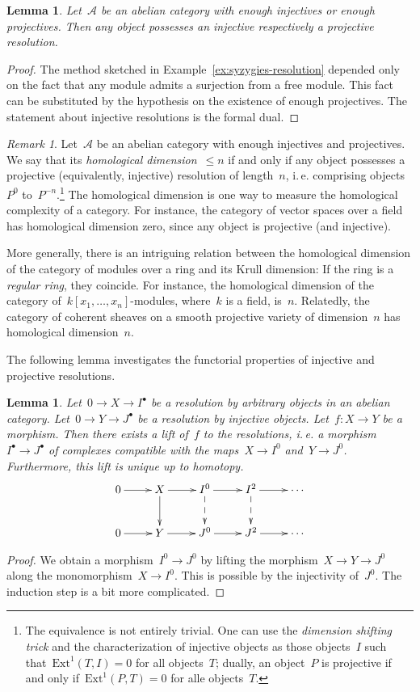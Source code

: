 \documentclass{amsart}
\makeatletter
\theoremstyle{definition}
\theoremstyle{plain}
\newtheorem{lemma}[defn]{Lemma}
\theoremstyle{remark}
\newtheorem{rem}[defn]{Remark}
\newcommand{\A}{\mathcal{A}}
\newcommand{\Ext}{\mathrm{Ext}}
\newcommand{\?}{\,{:}\,}
\renewcommand{\_}{\mathpunct{.}\,}
\newcommand{\ie}{i.\,e.\@\xspace}
\makeatother
\begin{document}
\begin{lemma}Let~$\A$ be an abelian category with enough injectives or enough
projectives. Then any object possesses an injective respectively a projective
resolution.\end{lemma}
\begin{proof}The method sketched in Example~\ref{ex:syzygies-resolution}
depended only on the fact that any module admits a surjection from a free
module. This fact can be substituted by the hypothesis on the existence of
enough projectives. The statement about injective resolutions is the formal
dual.\end{proof}

\begin{rem}Let~$\A$ be an abelian category with enough injectives and
projectives. We say that its \emph{homological dimension}~$\leq n$ if and only
if any object possesses a projective (equivalently, injective) resolution of
length~$n$, \ie comprising objects~$P^0$ to~$P^{-n}$.\footnote{The equivalence
is not entirely trivial. One can use the \emph{dimension shifting trick}
and the characterization of injective objects as those objects~$I$ such
that~$\Ext^1(T,I) = 0$ for all objects~$T$; dually, an object~$P$ is projective
if and only if~$\Ext^1(P,T) = 0$ for alle objects~$T$.} The homological
dimension is one way to measure the homological complexity of a category. For
instance, the category of vector spaces over a field has homological dimension
zero, since any object is projective (and injective).

More generally, there is
an intriguing relation between the homological dimension of the category of
modules over a ring and its Krull dimension: If the ring is a \emph{regular
ring}, they coincide. For instance, the homological dimension of the category
of~$k[x_1,\ldots,x_n]$-modules, where~$k$ is a field, is~$n$. Relatedly, the
category of coherent sheaves on a smooth projective variety of
dimension~$n$ has homological dimension~$n$.
\end{rem}

The following lemma investigates the functorial properties of injective and
projective resolutions.

\begin{lemma}\label{lemma:inj-funct}Let~$0 \to X \to I^\bullet$ be a resolution
by arbitrary objects in an abelian category. Let~$0 \to Y \to J^\bullet$ be a
resolution by injective objects. Let~$f : X \to Y$ be a morphism. Then there
exists a lift of~$f$ to the resolutions, \ie a morphism~$I^\bullet \to
J^\bullet$ of complexes compatible with the maps~$X \to I^0$ and~$Y \to J^0$.
Furthermore, this lift is unique up to homotopy.
\[ \xymatrix{
  0 \ar[r] & X \ar[r]\ar[d] & I^0 \ar[r]\ar@{-->}[d] & I^2 \ar[r]\ar@{-->}[d] & \cdots \\
  0 \ar[r] & Y \ar[r] & J^0 \ar[r] & J^2 \ar[r] & \cdots
} \]
\end{lemma}
\begin{proof}We obtain a morphism~$I^0 \to J^0$ by lifting the morphism~$X \to
Y \to J^0$ along the monomorphism~$X \to I^0$. This is possible by the
injectivity of~$J^0$. The induction step is a bit more complicated.
\end{proof}
\end{document}
